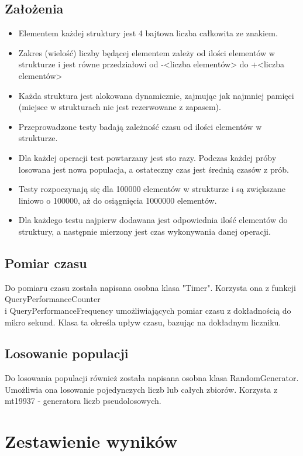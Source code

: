 \documentclass{article}
\begin{document}
    \subsection{Założenia}
    \begin{itemize}
        \item Elementem każdej struktury jest 4 bajtowa liczba całkowita ze znakiem.
        \item Zakres (wielość) liczby będącej elementem zależy od ilości elementów w strukturze i jest równe przedziałowi od -<liczba elementów> do +<liczba elementów>
        \item Każda struktura jest alokowana dynamicznie, zajmując jak najmniej pamięci (miejsce w strukturach nie jest rezerwowane z zapasem). 
        \item Przeprowadzone testy badają zależność czasu od ilości elementów w strukturze. 
        \item Dla każdej operacji test powtarzany jest sto razy. Podczas każdej próby losowana jest nowa populacja, a ostateczny czas jest średnią czasów z prób.
        \item Testy rozpoczynają się dla 100000 elementów w strukturze i są zwiększane liniowo o 100000, aż do osiągnięcia 1000000 elementów.
        \item Dla każdego testu najpierw dodawana jest odpowiednia ilość elementów do struktury, a następnie mierzony jest czas wykonywania danej operacji.
    \end{itemize}

    \subsection{Pomiar czasu}
    Do pomiaru czasu została napisana osobna klasa "Timer". Korzysta ona z funkcji QueryPerformanceCounter\\
    i QueryPerformanceFrequency umożliwiających pomiar czasu z dokładnością do mikro sekund. Klasa ta określa upływ czasu, bazując na dokładnym liczniku.
    
    \subsection{Losowanie populacji}
    Do losowania populacji również została napisana osobna klasa RandomGenerator. Umożliwia ona losowanie pojedynczych liczb lub całych zbiorów.
    Korzysta z mt19937 - generatora liczb pseudolosowych.

\section{Zestawienie wyników}
\end{document}
